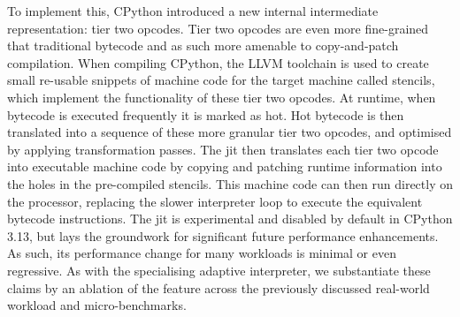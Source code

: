 To implement this, CPython introduced a new internal intermediate representation: tier two opcodes. Tier two opcodes are even more fine-grained that traditional bytecode and as such more amenable to copy-and-patch compilation.
When compiling CPython, the LLVM toolchain is used to create small re-usable snippets of machine code for the target machine called stencils, which implement the functionality of these tier two opcodes. At runtime, when bytecode is executed frequently it is marked as hot. Hot bytecode is then translated into a sequence of these more granular tier two opcodes, and optimised by applying transformation passes. The \ac{jit} then translates each tier two opcode into executable machine code by copying and patching runtime information into the holes in the pre-compiled stencils. This machine code can then run directly on the processor, replacing the slower interpreter loop to execute the equivalent bytecode instructions. %
The \ac{jit} is experimental and disabled by default in CPython 3.13, but lays the groundwork for significant future performance enhancements. As such, its performance change for many workloads is minimal or even regressive.
As with the specialising adaptive interpreter, we substantiate these claims by an ablation of the feature across the previously discussed real-world workload and micro-benchmarks.

